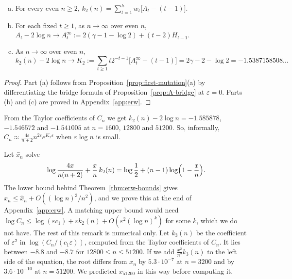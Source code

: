 \begin{theorem}\label{thm:K2}
\begin{enumerate}[(a)]
\item For every even $n\ge2$, $k_2(n)=\sum_{t=1}^hw_t\bigl[A_t-(t-1)\bigr]$.
\item For each fixed $t\ge1$, as $n\to\infty$ over even $n$,
$A_t-2\log n\to A^\infty_t:=2(\gamma-1-\log2)+(t-2)H_{t-1}$.
\item As $n\to\infty$ over even $n$,
\[
 k_2(n)-2\log n\to K_2:=\sum_{t\ge1}t2^{-t-1}\bigl[A^\infty_t-(t-1)\bigr]
 =2\gamma-2-\log2=-1.5387158508\ldots
\]
\end{enumerate}
\end{theorem}

\begin{proof}
Part (a) follows from Proposition~\ref{prop:first-mutation}(a) by
differentiating the bridge formula of Proposition~\ref{prop:A-bridge} at
$\varepsilon=0$. Parts (b) and (c) are
proved in Appendix~\ref{app:erw}.
\end{proof}

From the Taylor coefficients of $C_n$ we get $k_2(n)-2\log n=-1.585878$,
$-1.546572$ and $-1.541005$ at $n=1600$, $12800$ and $51200$. So,
informally,
$C_n\approx\frac{4\varepsilon}{n+2}n^{2\varepsilon}e^{K_2\varepsilon}$
when $\varepsilon\log n$ is small.

\begin{remark}\label{rem:refined}
Let $\hat x_n$ solve
\[
 \log\frac{4x}{n(n+2)}+\frac xn\,k_2(n)=\log\frac12+(n-1)\log\Bigl(1-\frac xn\Bigr).
\]
The lower bound behind Theorem~\ref{thm:erw-bounds} gives
$x_n\le\hat x_n+O((\log n)^3/n^2)$, and we prove this at the end of
Appendix~\ref{app:erw}. A matching upper bound would need
$\log C_n\le\log(\varepsilon c_1)+\varepsilon k_2(n)+O(\varepsilon^2(\log n)^k)$
for some $k$, which we do not have. The rest of this remark is numerical
only. Let $k_3(n)$ be the coefficient of $\varepsilon^2$ in
$\log(C_n/(c_1\varepsilon))$, computed from the Taylor coefficients of
$C_n$. It lies between $-8.8$ and $-8.7$ for $12800\le n\le51200$. If we
add $\frac{x^2}{n^2}k_3(n)$ to the left side of the equation, the root
differs from $x_n$ by $5.3\cdot10^{-7}$ at $n=3200$ and by
$3.6\cdot10^{-10}$ at $n=51200$. We predicted $x_{51200}$ in this way
before computing it.
\end{remark}

